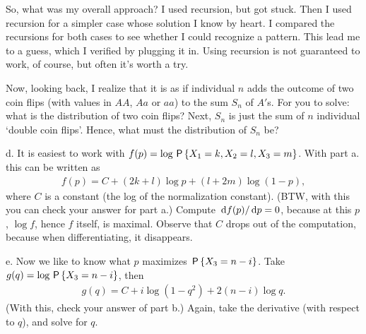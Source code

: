 \begin{exercise}
\begin{solution}
So, what was my overall approach?
I used recursion, but got stuck.
Then I used recursion for a simpler case whose solution I know by heart.
I compared the recursions for both cases to see whether I could recognize a pattern.
This lead me to a guess, which I verified by plugging it in.
Using recursion is not guaranteed to work, of course, but often it's worth a try.

Now, looking back, I realize that it is as if individual $n$ adds the outcome of two coin flips (with values in $AA$, $Aa$ or $a a$) to the sum $S_{n}$ of $A'$s. For you to solve: what is the distribution of two coin flips? Next, $S_n$ is just the sum of $n$ individual `double coin flips'. Hence, what must the distribution of $S_n$ be?

d. It is easiest to work with $f(p) = \log \P{X_1=k, X_2=l, X_3 = m}$. With part a. this can be written as
\begin{align*}
f(p) = C + (2k+l)\log p + (l+2m)\log(1-p),
\end{align*}
where $C$ is a constant (the log of the normalization constant). (BTW, with this you can check your answer for part a.)
Compute $\d f(p)/\d p = 0$, because at this $p$, $\log f$, hence $f$ itself, is maximal.  Observe that $C$ drops out of the computation, because when differentiating, it disappears.


e. Now we like to know what $p$  maximizes $\P{X_3=n-i}$. Take $g(q) = \log \P{X_3 = n-i}$, then
\begin{align*}
g(q) = C + i \log (1-q^{2}) + 2 (n-i)\log q.
\end{align*}
(With this, check your answer of part b.) Again, take the derivative (with respect to $q$), and solve for $q$.
\end{solution}
\end{exercise}

